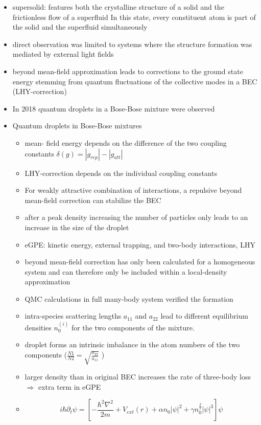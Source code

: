 \begin{itemize}
    \item supersolid: features both the crystalline structure of a solid and the frictionless flow of a superfluid
In this state, every constituent atom is part of the solid and the superfluid simultaneously
    \item direct observation was limited to systems where the structure formation was mediated by external light fields
    \item beyond mean-field approximation leads to corrections to the ground
state energy stemming from quantum fluctuations of the collective modes in a BEC (LHY-correction)
    \item In 2018 quantum droplets in a Bose-Bose mixture were observed

    \item Quantum droplets in Bose-Bose mixtures
    \begin{itemize}
        \item mean- field energy depends on the difference of the two coupling constants
            $\delta(g) = |g_{rep}| - |g_{att}|$ \item LHY-correction depends on the individual coupling constants
        \item For weakly attractive combination of interactions, a repulsive beyond mean-field correction
            can stabilize the BEC
        \item after a peak density increasing the number of particles only leads to an increase in the
    size of the droplet
        \item eGPE: kinetic energy, external trapping, and two-body interactions, LHY
        \item beyond mean-field correction has only been calculated for a homogeneous system and can therefore
            only be included within a local-density approximation
        \item QMC calculations in full many-body system verified the formation
        \item intra-species scattering lengths $a_{11}$ and $a_{22}$ lead to different equilibrium densities
            $n^{(i)}_{0}$ for the two components of the mixture.
        \item droplet forms an intrinsic imbalance in the atom numbers of the two components
            ($\frac{N1}{N2} = \sqrt{\frac{a_{22}}{a_{11}}}$ )
        \item larger density than in original BEC increases the rate of three-body loss $\Rightarrow$ extra term in eGPE
        \item[]
            \begin{equation}
                i \hbar \partial_{t} \psi = \left[ - \frac{\hbar^{2} \nabla^{2}}{2 m}
                                            + V_{ext}(r)
                                            + \alpha n_{0} |\psi|^{2}
                                            + \gamma n_{0}^{\frac{3}{2}} |\psi|^{3} \right] \psi
            \end{equation}
    \end{itemize}
\end{itemize}

